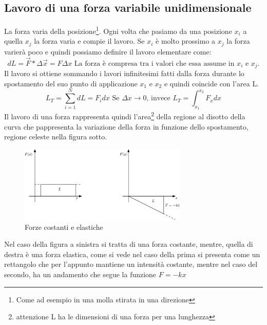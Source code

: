 \subsection{Lavoro di una forza variabile unidimensionale}
\begin{defi}
  La forza varia della posizione\footnote{Come ad esempio in una molla stirata in una direzione}.
  Ogni volta che pasiamo da una posizione $x_i$ a quella $x_j$ la forza varia e compie il lavoro.
  Se $x_i$ è molto prossimo a $x_j$ la forza varierà poco e quindi possiamo definire il lavoro
  elementare come:
  \begin{equation*}
    dL=\vec{F}*\Delta\vec{x}=F\Delta x \text{ La forza è compresa tra i valori che
      essa assume in $x_i$ e $x_j$.}
  \end{equation*}
  Il lavoro si ottiene sommando i lavori infinitesimi fatti dalla forza durante lo spostamento del
  suo punto di applicazione $x_1$ e $x_2$ e quindi coincide con l'area L.
  \begin{equation*}
    L_T=\sum_{i=1}^N dL=F_idx \text{ Se $\Delta x \to 0$, invece } L_T=\int_{x_1}^{x_2} F_x dx
  \end{equation*}
  Il lavoro di una forza rappresenta quindi l'area\footnote{attenzione L ha le dimensioni di una
    forza per una lunghezza} della regione al disotto della curva che pappresenta la variazione
  della forza in funzione dello spostamento, regione celeste nella figura sotto.
  \clearpage
  \begin{figure}[th]
    \centering
    \includegraphics[width=8cm]{img/finiti/forze_costanti_e_elastiche.eps}
    \caption{Forze costanti e elastiche}
  \end{figure}
\end{defi}
\begin{nota}
  Nel caso della figura a sinistra si tratta di una forza costante, mentre, quella di destra è una
  forza elastica, come si vede nel caso della prima si presenta come un rettangolo che per
  l'appunto mantiene un intensità costante, mentre nel caso del secondo, ha un andamento che segue
  la funzione $F= -kx$
\end{nota}
